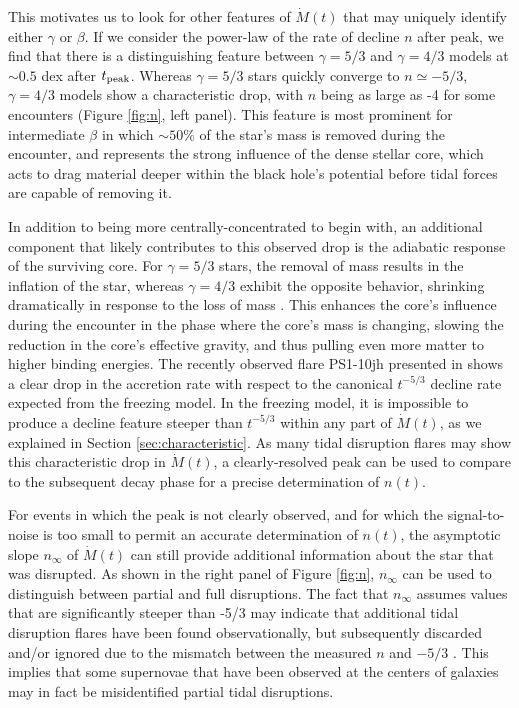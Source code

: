 \documentclass[twocolumn]{emulateapj}
\newcommand{\md}{\dot{M}\left(t\right)}
\newcommand{\tpeak}{t_{\rm peak}}
\newcommand{\ninf}{n_{\infty}}
\begin{document}
This motivates us to look for other features of $\md$ that may uniquely identify either $\gamma$ or $\beta$. If we consider the power-law of the rate of decline $n$ after peak, we find that there is a distinguishing feature between $\gamma = 5/3$ and $\gamma = 4/3$ models at $\sim 0.5$ dex after $\tpeak$. Whereas $\gamma = 5/3$ stars quickly converge to $n \simeq -5/3$, $\gamma = 4/3$ models show a characteristic drop, with $n$ being as large as -4 for some encounters (Figure \ref{fig:n}, left panel). This feature is most prominent for intermediate $\beta$ in which $\sim 50\%$ of the star's mass is removed during the encounter, and represents the strong influence of the dense stellar core, which acts to drag material deeper within the black hole's potential before tidal forces are capable of removing it.

In addition to being more centrally-concentrated to begin with, an additional component that likely contributes to this observed drop is the adiabatic response of the surviving core. For $\gamma = 5/3$ stars, the removal of mass results in the inflation of the star, whereas $\gamma = 4/3$ exhibit the opposite behavior, shrinking dramatically in response to the loss of mass \citep{Hjellming:1987ci}. This enhances the core's influence during the encounter in the phase where the core's mass is changing, slowing the reduction in the core's effective gravity, and thus pulling even more matter to higher binding energies. The recently observed flare PS1-10jh presented in \cite{Gezari:2012fk} shows a clear drop in the accretion rate with respect to the canonical $t^{-5/3}$ decline rate expected from the freezing model. In the freezing model, it is impossible to produce a decline feature steeper than $t^{-5/3}$ within any part of $\md$, as we explained in Section \ref{sec:characteristic}. As many tidal disruption flares may show this characteristic drop in $\md$, a clearly-resolved peak can be used to compare to the subsequent decay phase for a precise determination of $n(t)$.

For events in which the peak is not clearly observed, and for which the signal-to-noise is too small to permit an accurate determination of $n(t)$, the asymptotic slope $\ninf$ of $\md$ can still provide additional information about the star that was disrupted. As shown in the right panel of Figure \ref{fig:n}, $\ninf$ can be used to distinguish between partial and full disruptions. The fact that $\ninf$ assumes values that are significantly steeper than -5/3 may indicate that additional tidal disruption flares have been found observationally, but subsequently discarded and/or ignored due to the mismatch between the measured $n$ and $-5/3$ \citep{vanVelzen:2011gz}. This implies that some supernovae that have been observed at the centers of galaxies may in fact be misidentified partial tidal disruptions.
\end{document}
